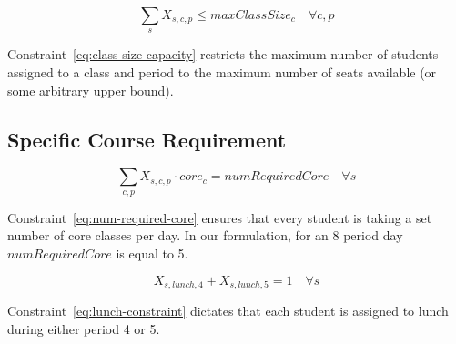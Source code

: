 \documentclass[12pt]{article}
\begin{document}
\begin{equation} \label{eq:class-size-capacity}
	\displaystyle \sum_{s} X_{s,c,p} \leq maxClassSize_{c} \quad \forall c,p
\end{equation}

Constraint~\ref{eq:class-size-capacity} restricts the maximum number of students assigned to a class and period to the maximum number of seats available (or some arbitrary upper bound).


\subsection{Specific Course Requirement}

\begin{equation} \label{eq:num-required-core}
	\displaystyle \sum_{c,p} X_{s,c,p} \cdot core_{c} = numRequiredCore \quad \forall s
\end{equation}

Constraint~\ref{eq:num-required-core} ensures that every student is taking a set number of core classes per day. In our formulation, for an 8 period day $numRequiredCore$ is equal to 5.

\begin{equation} \label{eq:lunch-constraint}
	X_{s,lunch,4} + X_{s,lunch,5} = 1 \quad \forall s
\end{equation}

Constraint~\ref{eq:lunch-constraint} dictates that each student is assigned to lunch during either period 4 or 5.
\end{document}
